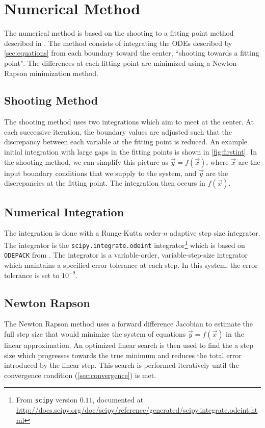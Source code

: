 \documentclass[12pt]{article}
\renewcommand{\v}[1]{\vec{#1}} %
\begin{document}
\section{Numerical Method}\label{sec:numerical}
The numerical method is based on the shooting to a fitting point method described in \citet{Press:2007tk}. The method consists of integrating the ODEs described by \cref{sec:equations} from each boundary toward the center, ``shooting towards a fitting point". The differences at each fitting point are minimized using a Newton-Rapson minimization method.
\subsection{Shooting Method}
The shooting method uses two integrations which aim to meet at the center. At each successive iteration, the boundary values are adjusted such that the discrepancy between each variable at the fitting point is reduced. An example initial integration with large gaps in the fitting points is shown in \cref{fig:firstint}. In the shooting method, we can simplify this picture as $\v{y} = f(\v{x})$, where $\v{x}$ are the input boundary conditions that we supply to the system, and $\v{y}$ are the discrepancies at the fitting point. The integration then occurs in $f(\v{x})$.

\subsection{Numerical Integration}
The integration is done with a Runge-Kutta order-$n$ adaptive step size integrator. The integrator is the \lstinline{scipy.integrate.odeint} integrator\footnote{From \lstinline{scipy} version $0.11$, documented at \url{http://docs.scipy.org/doc/scipy/reference/generated/scipy.integrate.odeint.html}} which is based on \lstinline{ODEPACK} from \citet{hindmarsh1983odepack}. The integrator is a variable-order, variable-step-size integrator which maintains a specified error tolerance at each step. In this system, the error tolerance is set to $10^{-9}$.

\subsection{Newton Rapson}
The Newton Rapson method \citep[from][]{Press:2007tk} uses a forward difference Jacobian to estimate the full step size that would minimize the system of equations $\v{y} = f(\v{x})$ in the linear approximation. An optimized linear search is then used to find the a step size which progresses towards the true minimum and reduces the total error introduced by the linear step. This search is performed iteratively until the convergence condition (\cref{sec:convergence}) is met.
\end{document}
